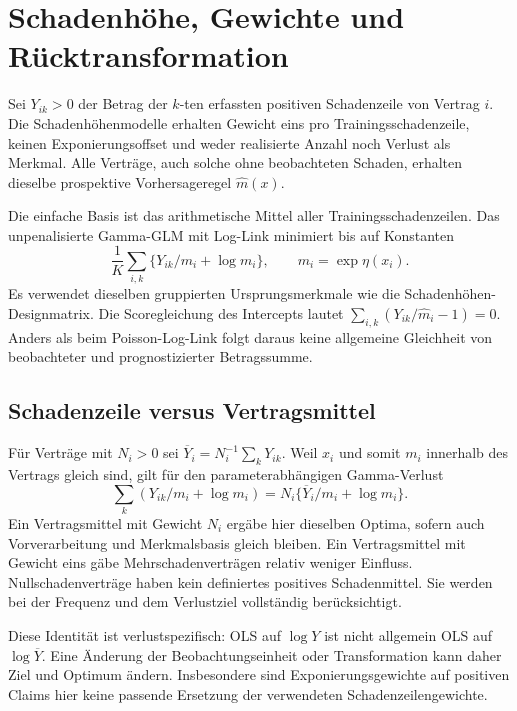 \documentclass[11pt,a4paper]{article}
\begin{document}
\clearpage
\section{Schadenhöhe, Gewichte und Rücktransformation}
Sei $Y_{ik}>0$ der Betrag der $k$-ten erfassten positiven Schadenzeile von Vertrag $i$. Die Schadenhöhenmodelle erhalten Gewicht eins pro Trainingsschadenzeile, keinen Exponierungsoffset und weder realisierte Anzahl noch Verlust als Merkmal. Alle Verträge, auch solche ohne beobachteten Schaden, erhalten dieselbe prospektive Vorhersageregel $\widehat m(x)$.

Die einfache Basis ist das arithmetische Mittel aller Trainingsschadenzeilen. Das unpenalisierte Gamma-GLM mit Log-Link minimiert bis auf Konstanten
\begin{equation}
 \frac1K\sum_{i,k}\{Y_{ik}/m_i+\log m_i\},\qquad m_i=\exp\eta(x_i).
\end{equation}
Es verwendet dieselben gruppierten Ursprungsmerkmale wie die Schadenhöhen-Designmatrix. Die Scoregleichung des Intercepts lautet $\sum_{i,k}(Y_{ik}/\widehat m_i-1)=0$. Anders als beim Poisson-Log-Link folgt daraus keine allgemeine Gleichheit von beobachteter und prognostizierter Betragssumme.

\subsection*{Schadenzeile versus Vertragsmittel}
Für Verträge mit $N_i>0$ sei $\overline Y_i=N_i^{-1}\sum_kY_{ik}$. Weil $x_i$ und somit $m_i$ innerhalb des Vertrags gleich sind, gilt für den parameterabhängigen Gamma-Verlust
\begin{equation}
 \sum_k(Y_{ik}/m_i+\log m_i)
 =N_i\{\overline Y_i/m_i+\log m_i\}.
\end{equation}
Ein Vertragsmittel mit Gewicht $N_i$ ergäbe hier dieselben Optima, sofern auch Vorverarbeitung und Merkmalsbasis gleich bleiben. Ein Vertragsmittel mit Gewicht eins gäbe Mehrschadenverträgen relativ weniger Einfluss. Nullschadenverträge haben kein definiertes positives Schadenmittel. Sie werden bei der Frequenz und dem Verlustziel vollständig berücksichtigt.

Diese Identität ist verlustspezifisch: OLS auf $\log Y$ ist nicht allgemein OLS auf $\log\overline Y$. Eine Änderung der Beobachtungseinheit oder Transformation kann daher Ziel und Optimum ändern. Insbesondere sind Exponierungsgewichte auf positiven Claims hier keine passende Ersetzung der verwendeten Schadenzeilengewichte.
\end{document}
